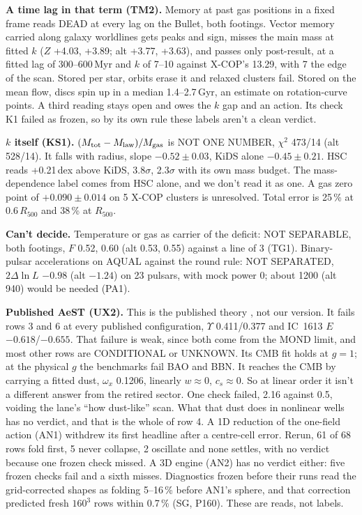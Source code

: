 \documentclass[10pt]{article}
\begin{document}
\textbf{A time lag in that term (TM2).} Memory at past gas positions in a fixed frame reads DEAD at every lag on the Bullet, both footings. Vector memory carried along galaxy worldlines gets peaks and sign, misses the main mass at fitted $k$ ($Z$ +4.03, +3.89; alt +3.77, +3.63), and passes only post-result, at a fitted lag of 300--600\,Myr and $k$ of 7--10 against X-COP's 13.29, with 7 the edge of the scan. Stored per star, orbits erase it and relaxed clusters fail. Stored on the mean flow, discs spin up in a median 1.4--2.7\,Gyr, an estimate on rotation-curve points. A third reading stays open and owes the $k$ gap and an action. Its check K1 failed as frozen, so by its own rule these labels aren't a clean verdict.

\textbf{$k$ itself (KS1).} $(M_{\rm tot}-M_{\rm law})/M_{\rm gas}$ is NOT ONE NUMBER, $\chi^2$ 473/14 (alt 528/14). It falls with radius, slope $-0.52\pm0.03$, KiDS alone $-0.45\pm0.21$. HSC reads +0.21\,dex above KiDS, 3.8$\sigma$, 2.3$\sigma$ with its own mass budget. The mass-dependence label comes from HSC alone, and we don't read it as one. A gas zero point of $+0.090\pm0.014$ on 5 X-COP clusters is unresolved. Total error is 25\,\% at 0.6\,$R_{500}$ and 38\,\% at $R_{500}$.

\textbf{Can't decide.} Temperature or gas as carrier of the deficit: NOT SEPARABLE, both footings, $F$ 0.52, 0.60 (alt 0.53, 0.55) against a line of 3 (TG1). Binary-pulsar accelerations \cite{D25} on AQUAL against the round rule: NOT SEPARATED, $2\Delta\ln L$ $-0.98$ (alt $-1.24$) on 23 pulsars, with mock power 0; about 1200 (alt 940) would be needed (PA1).

\textbf{Published AeST (UX2).} This is the published theory \cite{SZ}, not our version. It fails rows 3 and 6 at every published configuration, $\Upsilon$ 0.411/0.377 and IC~1613 $E$ $-0.618$/$-0.655$. That failure is weak, since both come from the MOND limit, and most other rows are CONDITIONAL or UNKNOWN. Its CMB fit holds at $g=1$; at the physical $g$ the benchmarks fail BAO and BBN. It reaches the CMB by carrying a fitted dust, $\omega_x$ 0.1206, linearly $w\approx0$, $c_s\approx0$. So at linear order it isn't a different answer from the retired sector. One check failed, 2.16 against 0.5, voiding the lane's ``how dust-like'' scan. What that dust does in nonlinear wells has no verdict, and that is the whole of row 4. A 1D reduction of the one-field action (AN1) withdrew its first headline after a centre-cell error. Rerun, 61 of 68 rows fold first, 5 never collapse, 2 oscillate and none settles, with no verdict because one frozen check missed. A 3D engine (AN2) has no verdict either: five frozen checks fail and a sixth misses. Diagnostics frozen before their runs read the grid-corrected shapes as folding 5--16\,\% before AN1's sphere, and that correction predicted fresh $160^3$ rows within 0.7\,\% (SG, P160). These are reads, not labels.
\end{document}
